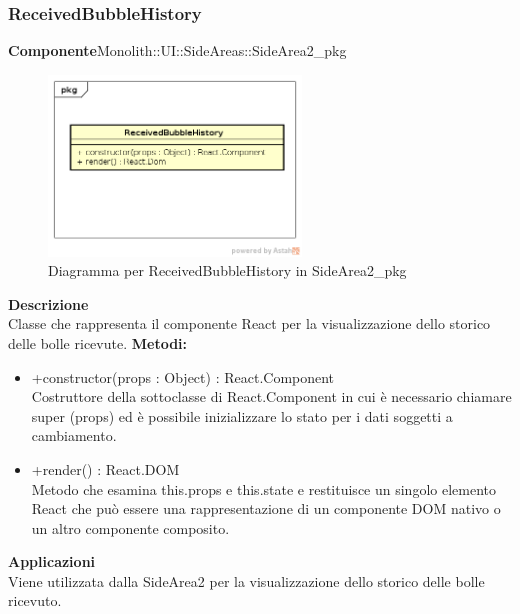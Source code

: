 \subsubsection{ReceivedBubbleHistory}
\textbf{Componente}Monolith::UI::SideAreas::SideArea2\_pkg\\
   \FloatBarrier
   \begin{figure}[ht]
   \centering
   \includegraphics[width=0.6\textwidth]{img/single-ReceivedBubbleHistory}
   \caption{{Diagramma per ReceivedBubbleHistory in SideArea2\_pkg}}
\end{figure}
\FloatBarrier
\textbf{Descrizione}\\
Classe che rappresenta il componente React per la visualizzazione dello storico delle bolle ricevute.
\textbf{Metodi:} \begin{itemize}\item +constructor(props : Object) : React.Component \\Costruttore della sottoclasse di React.Component in cui è necessario chiamare super (props) ed è possibile inizializzare lo stato per i dati soggetti a cambiamento.\item +render() : React.DOM \\Metodo che esamina this.props e this.state e restituisce un singolo elemento React che può essere una rappresentazione di un componente DOM nativo o un altro componente composito.\end{itemize} 


\textbf{Applicazioni}\\
Viene utilizzata dalla SideArea2 per la visualizzazione dello storico delle bolle ricevuto. 


\clearpage

